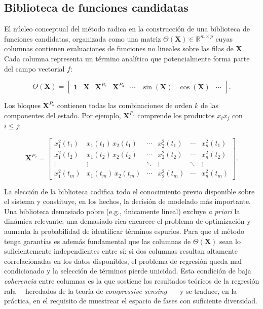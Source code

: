 \subsection{Biblioteca de funciones candidatas}

El núcleo conceptual del método radica en la construcción de una biblioteca de funciones candidatas, organizada como una matriz $\Theta(\mathbf{X}) \in \mathbb{R}^{m \times p}$ cuyas columnas contienen evaluaciones de funciones no lineales sobre las filas de $\mathbf{X}$. Cada columna representa un término analítico que potencialmente forma parte del campo vectorial $f$:

\[
\Theta(\mathbf{X}) =
\begin{bmatrix}
\mathbf{1} & \mathbf{X} & \mathbf{X}^{P_2} & \mathbf{X}^{P_3} & \cdots & \sin(\mathbf{X}) & \cos(\mathbf{X}) & \cdots
\end{bmatrix}.
\]

Los bloques $\mathbf{X}^{P_k}$ contienen todas las combinaciones de orden $k$ de las componentes del estado. Por ejemplo, $\mathbf{X}^{P_2}$ comprende los productos $x_i x_j$ con $i \le j$:

\[
\mathbf{X}^{P_2} =
\begin{bmatrix}
x_1^2(t_1) & x_1(t_1)\,x_2(t_1) & \cdots & x_2^2(t_1) & \cdots & x_n^2(t_1) \\
x_1^2(t_2) & x_1(t_2)\,x_2(t_2) & \cdots & x_2^2(t_2) & \cdots & x_n^2(t_2) \\
\vdots & \vdots & \ddots & \vdots & \ddots & \vdots \\
x_1^2(t_m) & x_1(t_m)\,x_2(t_m) & \cdots & x_2^2(t_m) & \cdots & x_n^2(t_m)
\end{bmatrix}.
\]


La elección de la biblioteca codifica todo el conocimiento previo disponible sobre el sistema y constituye, en los hechos, la decisión de modelado más importante. Una biblioteca demasiado pobre (e.g., únicamente lineal) excluye \textit{a priori} la dinámica relevante; una demasiado rica encarece el problema de optimización y aumenta la probabilidad de identificar términos espurios. Para que el método tenga garantías es además fundamental que las columnas de $\Theta(\mathbf{X})$ sean lo suficientemente independientes entre sí: si dos columnas resultan altamente correlacionadas en los datos disponibles, el problema de regresión queda mal condicionado y la selección de términos pierde unicidad. Esta condición de baja \textit{coherencia} entre columnas es la que sostiene los resultados teóricos de la regresión rala —heredados de la teoría de \textit{compressive sensing}~\cite{candes2008cs}— y se traduce, en la práctica, en el requisito de muestrear el espacio de fases con suficiente diversidad.

